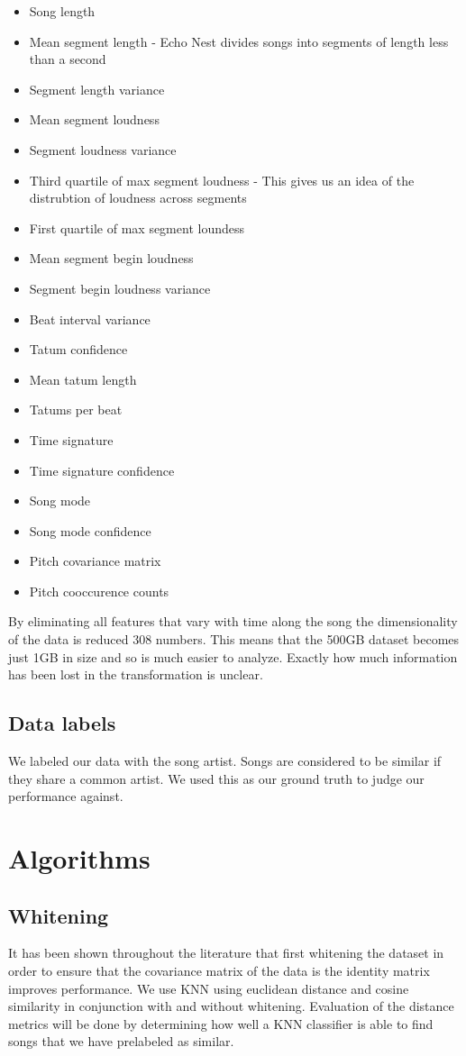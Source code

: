\documentclass[a4paper,10pt]{article}
\begin{document}
\begin{itemize}
 \item Song length 
 \item Mean segment length - Echo Nest divides songs into segments of length less than a second
 \item Segment length variance
 \item Mean segment loudness
 \item Segment loudness variance
 \item Third quartile of max segment loudness - This gives us an idea of the distrubtion of loudness across segments
 \item First quartile of max segment loundess
 \item Mean segment begin loudness
 \item Segment begin loudness variance
 \item Beat interval variance
 \item Tatum confidence
 \item Mean tatum length
 \item Tatums per beat
 \item Time signature
 \item Time signature confidence
 \item Song mode
 \item Song mode confidence
 \item Pitch covariance matrix
 \item Pitch cooccurence counts
\end{itemize}

By eliminating all features that vary with time along the song the dimensionality of the data is reduced 308 numbers. This means that the 500GB dataset becomes just 1GB in size and so is much easier to analyze. Exactly how much information has been lost in the transformation is unclear. 
\subsection{Data labels}
We labeled our data with the song artist. Songs are considered to be similar if they share a common artist. We used this as our ground truth to judge our performance against.
\section{Algorithms}
\subsection{Whitening}
It has been shown throughout the literature that first whitening the dataset in order to ensure that the covariance matrix of the data is the identity matrix improves performance. We use KNN using euclidean distance and cosine similarity in conjunction with and without whitening. Evaluation of the distance metrics will be done by determining how well a KNN classifier is able to find songs that we have prelabeled as similar.
\end{document}
